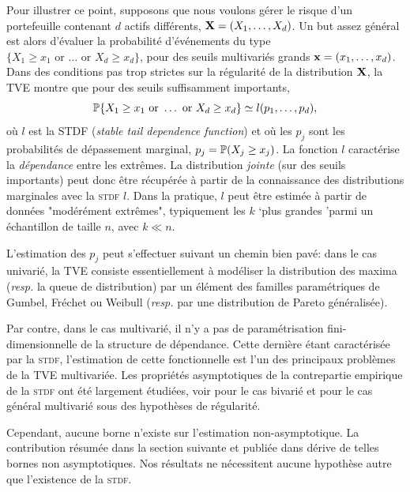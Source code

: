 Pour illustrer ce point, supposons que nous voulons gérer le risque d'un portefeuille contenant $ d $ actifs différents, $ \mb X = (X_1, \ldots, X_d) $. Un but assez général est alors d'évaluer la probabilité d'événements du type
 $\{X_1 \ge x_1 \text{ or }  \dotsc \text{ or } X_d\ge x_d \}$, 
pour des seuils multivariés grands $\mb x=(x_1,\ldots,x_d)$. Dans des conditions pas trop strictes sur la régularité de la distribution $ \mb X $, la \textsc {TVE} montre que pour des seuils suffisamment importants,
\[
\P\{X_1 \ge x_1 \text{ or }  \dotsc \text{ or }
X_d\ge x_d \} \simeq 
l(p_1,\ldots,p_d), 
\] 
où $ l $ est la STDF (\emph{stable tail dependence function}) et où les $ p_j $  sont les probabilités de dépassement marginal, $ p_j = \P (X_j \ge x_j) $. La fonction $ l $ caractérise la \emph {dépendance} entre les extrêmes. La distribution \emph {jointe} (sur des seuils importants) peut donc être récupérée à partir de la connaissance des distributions marginales avec la \textsc {stdf} $ l $. Dans la pratique, $ l $ peut être estimée à partir de données "modérément extrêmes", typiquement les $ k $ `plus grandes 'parmi un échantillon de taille $ n $, avec $ k \ll n $.

L'estimation des $ p_j $ peut s'effectuer suivant un chemin bien pavé: dans le cas univarié, la \textsc {TVE} consiste essentiellement à modéliser la distribution des maxima (\emph {resp.} la queue de distribution) par un élément des familles paramétriques de Gumbel, Fréchet ou Weibull (\emph {resp.} par une distribution de Pareto généralisée).

Par contre, dans le cas multivarié, il n'y a pas de paramétrisation fini-dimensionnelle de la structure de dépendance.
Cette dernière étant caractérisée par la \textsc {stdf}, l'estimation de cette fonctionnelle est l'un des principaux problèmes de la \textsc {TVE} multivariée. Les propriétés asymptotiques de la contrepartie empirique de la \textsc {stdf} ont été largement étudiées, voir \cite {Huangphd, Drees98, Embrechts2000, dHF06} pour le cas bivarié et \cite {Qi97, Einmahl2012} pour le cas général multivarié sous des hypothèses de régularité.

Cependant, aucune borne n'existe sur l'estimation non-asymptotique. La contribution résumée dans la section suivante et publiée dans \cite{COLT15} dérive de telles bornes non asymptotiques. Nos résultats ne nécessitent aucune hypothèse autre que l'existence de la \textsc {stdf}.


